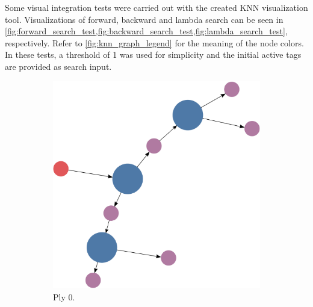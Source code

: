\documentclass[titlepage,11pt]{article}
\begin{document}
Some visual integration tests were carried out with the created KNN visualization tool. Visualizations of forward, backward and lambda search can be seen in \cref{fig:forward_search_test,fig:backward_search_test,fig:lambda_search_test}, respectively. Refer to \cref{fig:knn_graph_legend} for the meaning of the node colors. In these tests, a threshold of 1 was used for simplicity and the initial active tags are provided as search input.

\begin{figure}
	\begin{subfigure}[!htb]{0.32\textwidth}
		\centering
		\includegraphics[width=\columnwidth]{figures/knn_simple_forward_think_0.pdf}
		\caption{Ply 0.}
	\end{subfigure}
	\begin{subfigure}[!htb]{0.32\textwidth}
		\centering

\end{subfigure}
\end{figure}
\end{document}
